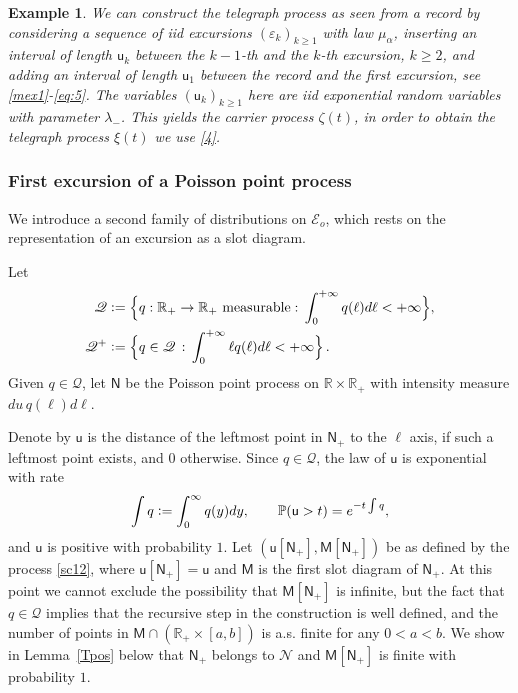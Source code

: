 \documentclass[12pt]{article}
\numberwithin{equation}{section}
\newtheorem{example}[theorem]{Example}
\newcommand{\PP}{\mathbb P}
\newcommand{\RR}{\mathbb R}
\newcommand{\cE}{\mathcal E}
\newcommand{\sM}{\mathsf{M}}
\newcommand{\sN}{\mathsf{N}}
\newcommand{\su}{{\mathsf{u}}}
\newcommand{\vep}{\varepsilon}
\begin{document}
\begin{example}
We can construct the telegraph process as seen from a record by considering a sequence of iid excursions $(\vep_k)_{k\ge 1}$ with law $\mu_{\alpha}$, inserting an interval of length $\su_k$ between the $k-1$-th and the $k$-th excursion, $k\ge 2$, and adding an interval of length $\su_1$ between the record and the first excursion, see \eqref{mex1}-\eqref{eq:5}. The variables $(\su_k)_{k\ge 1}$ here are iid exponential random variables with parameter $\lambda_-$. This yields the carrier process $\zeta(t)$, in order to obtain the telegraph process $\xi(t)$ we use \eqref{4}. 
\end{example}


\subsubsection{First excursion of a Poisson point process}
\label{2.6.2}

We introduce a second family of distributions on $\cE_o$, which rests on the representation of an excursion as a slot diagram.

Let
\begin{align}	\mathscr Q&\vcentcolon =\Big\{q:\RR_+\to \RR_+ \text{ measurable}:\, \int_0^{+\infty}q(\ell)d\ell <+\infty\Big\}, \label{Q1}\\
  \mathscr Q^+&\vcentcolon =\Big\{q\in \mathscr Q\,:\, \int_0^{+\infty}\ell q(\ell) d\ell <+\infty\Big\}\,.\label{Q2}
\end{align}
Given $q\in \mathscr Q$, let $\sN$ be the Poisson point process on $\RR\times\RR_+$ with intensity measure $du\, q(\ell)d\ell$. 


Denote by $\su$ is the distance of the leftmost point in $\sN_+$ to the $\ell$ axis, if such a leftmost point exists, and $0$ otherwise. Since $q\in \mathscr Q$, the law of $\su$ is exponential with rate 
\begin{equation}\label{L1}
\int q\vcentcolon =\int_0^\infty q(y)dy,\qquad \PP(\su>t) = e^{-t\int q},
\end{equation} 
and $\su$ is positive with probability $1$. Let $(\su[\sN_+], \sM[\sN_+])$ be as defined by the process \eqref{sc12}, where 
$\su[\sN_+]=\su$ and $\sM$ is the first slot diagram of $\sN_+$. At this point we cannot exclude the possibility that $\sM[\sN_+]$ is infinite, but the fact that $q\in \mathscr Q$ implies that the recursive step in the construction is well defined, and the number of points in $\sM\cap (\RR_+\times [a,b])$ is a.s. finite for any $0<a<b$. We show in Lemma~\ref{Tpos}  below that $\sN_+$ belongs to $\mathcal N$ and $\sM[\sN_+]$ is finite with probability $1$.
\end{document}
